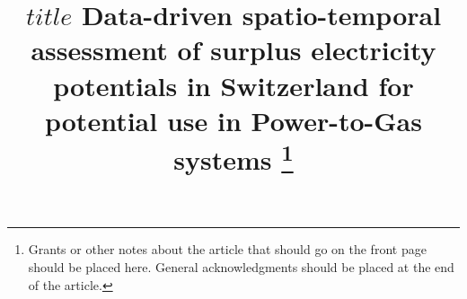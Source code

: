 %
%
%
%
%
%
%
\RequirePackage{fix-cm}
%
\documentclass[twocolumn]{svjour3}          %
%


%
\usepackage{mathptmx}      %
%



%



%
%



\title{$title$ Data-driven spatio-temporal assessment of surplus electricity potentials in Switzerland for potential use in Power-to-Gas systems
	\thanks{Grants or other notes
about the article that should go on the front page should be
placed here. General acknowledgments should be placed at the end of the article.}
}

